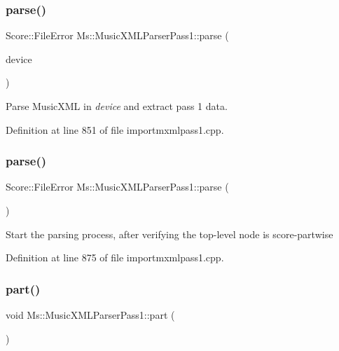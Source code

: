 \subsubsection{\texorpdfstring{parse()}{parse()}\hspace{0.1cm}{\footnotesize\ttfamily [1/2]}}
{\footnotesize\ttfamily Score\+::\+File\+Error Ms\+::\+Music\+X\+M\+L\+Parser\+Pass1\+::parse (\begin{DoxyParamCaption}\item[{Q\+I\+O\+Device $\ast$}]{device }\end{DoxyParamCaption})}

Parse Music\+X\+ML in {\itshape device} and extract pass 1 data. 

Definition at line 851 of file importmxmlpass1.\+cpp.

\mbox{\label{class_ms_1_1_music_x_m_l_parser_pass1_aff543e2b13503dc8646f50f269372211}} 
\subsubsection{\texorpdfstring{parse()}{parse()}\hspace{0.1cm}{\footnotesize\ttfamily [2/2]}}
{\footnotesize\ttfamily Score\+::\+File\+Error Ms\+::\+Music\+X\+M\+L\+Parser\+Pass1\+::parse (\begin{DoxyParamCaption}{ }\end{DoxyParamCaption})}

Start the parsing process, after verifying the top-\/level node is score-\/partwise 

Definition at line 875 of file importmxmlpass1.\+cpp.

\mbox{\label{class_ms_1_1_music_x_m_l_parser_pass1_a50e05b33caec82874456b7ea0c6a8eeb}} 
\subsubsection{\texorpdfstring{part()}{part()}}
{\footnotesize\ttfamily void Ms\+::\+Music\+X\+M\+L\+Parser\+Pass1\+::part (\begin{DoxyParamCaption}{ }\end{DoxyParamCaption})}

